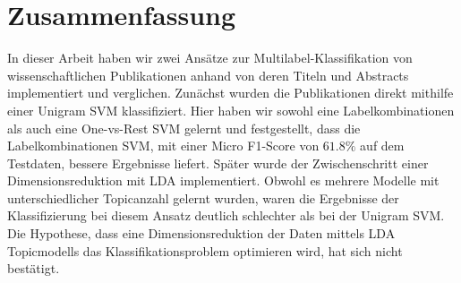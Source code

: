 \section{Zusammenfassung}

In dieser Arbeit haben wir zwei Ansätze zur Multilabel-Klassifikation von wissenschaftlichen Publikationen anhand von deren Titeln und Abstracts implementiert und verglichen.
Zunächst wurden die Publikationen direkt mithilfe einer Unigram SVM klassifiziert.
Hier haben wir sowohl eine Labelkombinationen als auch eine One-vs-Rest SVM gelernt und festgestellt, dass die Labelkombinationen SVM, mit einer Micro F1-Score von $61.8 \%$ auf dem Testdaten, bessere Ergebnisse liefert.
Später wurde der Zwischenschritt einer Dimensionsreduktion mit LDA implementiert.
Obwohl es mehrere Modelle mit unterschiedlicher Topicanzahl gelernt wurden, waren die Ergebnisse der Klassifizierung bei diesem Ansatz deutlich schlechter als bei der Unigram SVM.
Die Hypothese, dass eine Dimensionsreduktion der Daten mittels LDA Topicmodells das Klassifikationsproblem optimieren wird, hat sich nicht bestätigt.

